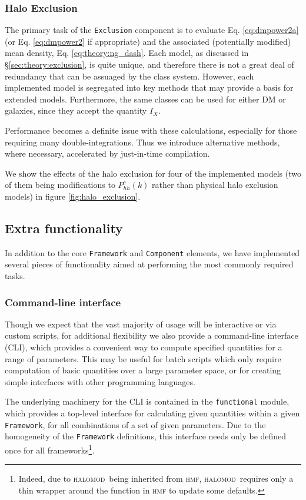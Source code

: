 \documentclass[5p]{elsarticle}
\newcommand{\halomod}{\textsc{halomod}}
\begin{document}
\subsubsection{Halo Exclusion}
\label{sec:halomod:components:exclusion}
The primary task of the \verb|Exclusion| component is to evaluate Eq. \ref{eq:dmpower2a} (or Eq. \ref{eq:dmpower2} if appropriate) and the associated (potentially modified) mean density, Eq. \ref{eq:theory:ng_dash}. Each model, as discussed in \S\ref{sec:theory:exclusion}, is quite unique, and therefore there is not a great deal of redundancy that can be assuaged by the class system. However, each implemented model is segregated into key methods that may provide a basis for extended models. Furthermore, the same classes can be used for either DM or galaxies, since they accept the quantity $I_X$. 

Performance becomes a definite issue with these calculations, especially for those requiring many double-integrations. Thus we introduce alternative methods, where necessary, accelerated by just-in-time compilation. 

We show the effects of the halo exclusion for four of the implemented models (two of them being modifications to $P_{hh}^c(k)$ rather than physical halo exclusion models) in figure \ref{fig:halo_exclusion}. 



\subsection{Extra functionality}
\label{sec:halomod:extra}
In addition to the core \verb|Framework| and \verb|Component| elements, we have implemented several pieces of functionality aimed at performing the most commonly required tasks.

\subsubsection{Command-line interface}
\label{sec:halomod:extra:cli}
Though we expect that the vast majority of usage will be interactive or via custom scripts, for additional flexibility we also provide a command-line interface (CLI), which provides a convenient way to compute specified quantities for a range of parameters. This may be useful for batch scripts which only require computation of basic quantities over a large parameter space, or for creating simple interfaces with other programming languages. 

The underlying machinery for the CLI is contained in the \verb|functional| module, which provides a top-level interface for calculating given quantities within a given \verb|Framework|, for all combinations of a set of given parameters. Due to the homogeneity of the \verb|Framework| definitions, this interface needs only be defined once for all frameworks\footnote{Indeed, due to \halomod\  being inherited from \textsc{hmf}, \halomod\  requires only a thin wrapper around the function in \textsc{hmf} to update some defaults.}. 
\end{document}
